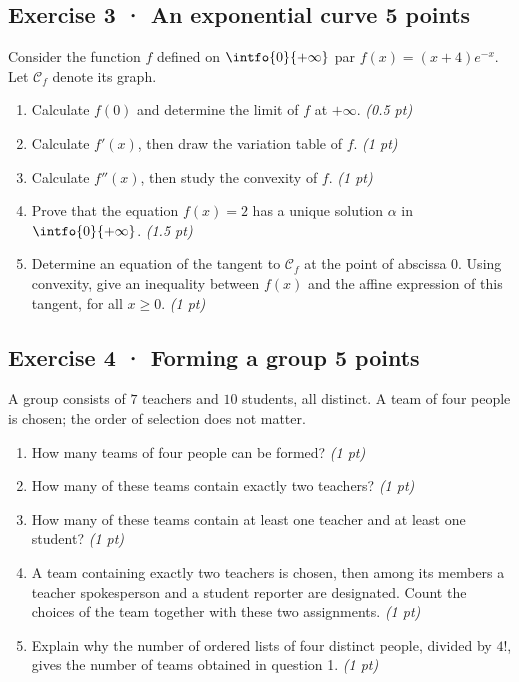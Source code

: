 \mxnewpage{}

\subsection*{Exercise 3 · An exponential curve \hfill 5 points}Consider the function $f$ defined on $\intfo{0}{+\infty}$ par $f(x)=(x+4)e^{-x}$. Let $\mathcal C_f$ denote its graph.

\begin{enumerate}

\item Calculate $f(0)$ and determine the limit of $f$ at $+\infty$. \hfill\textit{(0.5 pt)}

\item Calculate $f' (x)$, then draw the variation table of $f$. \hfill\textit{(1 pt)}

\item Calculate $f'' (x)$, then study the convexity of $f$. \hfill\textit{(1 pt)}

\item Prove that the equation $f(x)=2$ has a unique solution $\alpha$ in $\intfo{0}{+\infty}$. \hfill\textit{(1.5 pt)}

\item Determine an equation of the tangent to $\mathcal C_f$ at the point of abscissa $0$. Using convexity, give an inequality between $f(x)$ and the affine expression of this tangent, for all $x\ge0$. \hfill\textit{(1 pt)}

\end{enumerate}

\subsection*{Exercise 4 · Forming a group \hfill 5 points}A group consists of $7$ teachers and $10$ students, all distinct. A team of four people is chosen; the order of selection does not matter.

\begin{enumerate}

\item How many teams of four people can be formed? \hfill\textit{(1 pt)}

\item How many of these teams contain exactly two teachers? \hfill\textit{(1 pt)}

\item How many of these teams contain at least one teacher and at least one student? \hfill\textit{(1 pt)}

\item A team containing exactly two teachers is chosen, then among its members a teacher spokesperson and a student reporter are designated. Count the choices of the team together with these two assignments. \hfill\textit{(1 pt)}

\item Explain why the number of ordered lists of four distinct people, divided by $4!$, gives the number of teams obtained in question 1. \hfill\textit{(1 pt)}

\end{enumerate}

